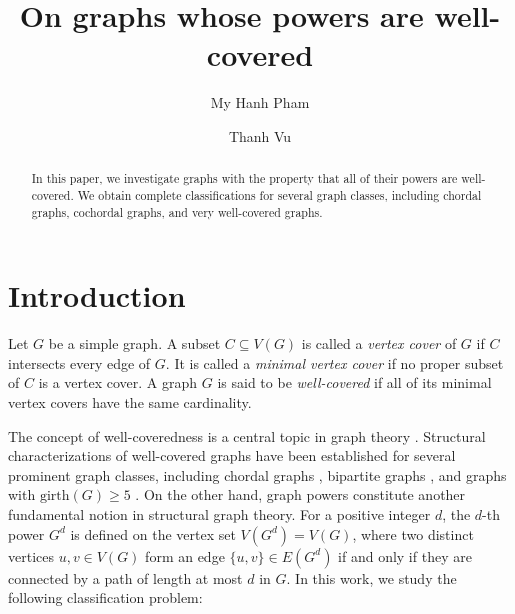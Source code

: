 \documentclass[12pt]{amsart}
\numberwithin{equation}{section}
\theoremstyle{definition}
\begin{document}
\title[Well-covered powers of graph]{On graphs whose powers are well-covered}
\date{}



\author[My Hanh Pham]{My Hanh Pham}
\address{Faculty of Education, An Giang University\\Vietnam National University Ho Chi Minh City\\ Long Xuyen, An Giang, Vietnam}


\author[Thanh Vu]{Thanh Vu}
\address{Institute of Mathematics, VAST, 18 Hoang Quoc Viet, Hanoi, Vietnam}


\let\thefootnote\relax{}

 
\begin{abstract} 
In this paper, we investigate graphs with the property that all of their powers are well-covered. We obtain complete classifications for several graph classes, including chordal graphs, cochordal graphs, and very well-covered graphs.
 \end{abstract}

\maketitle
 

\section{Introduction}
  \label{sec1} 

Let $G$ be a simple graph. A subset $C \subseteq V(G)$ is called a \emph{vertex cover} of $G$ if $C$ intersects every edge of $G$. It is called a \emph{minimal vertex cover} if no proper subset of $C$ is a vertex cover. A graph $G$ is said to be \emph{well-covered} if all of its minimal vertex covers have the same cardinality. 

The concept of well-coveredness is a central topic in graph theory \cite{BM, P}. Structural characterizations of well-covered graphs have been established for several prominent graph classes, including chordal graphs \cite{PTV}, bipartite graphs \cite{R}, and graphs with $\text{girth}(G) \ge 5$ \cite{FHN}. On the other hand, graph powers constitute another fundamental notion in structural graph theory. For a positive integer $d$, the $d$-th power $G^d$ is defined on the vertex set $V(G^d) = V(G)$, where two distinct vertices $u, v \in V(G)$ form an edge $\{u, v\} \in E(G^d)$ if and only if they are connected by a path of length at most $d$ in $G$. In this work, we study the following classification problem:
\end{document}
